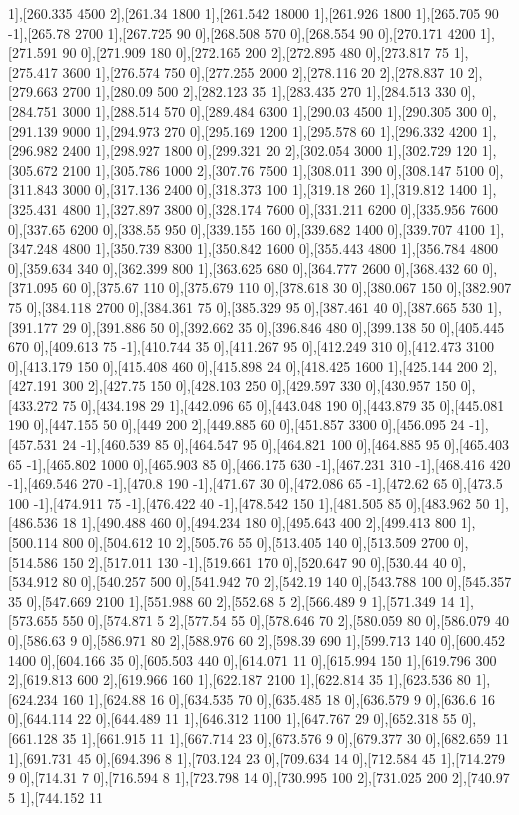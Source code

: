 {1],[260.335 4500 2],[261.34 1800 1],[261.542 18000 1],[261.926 1800 1],[265.705 90 -1],[265.78 2700 1],[267.725 90 0],[268.508 570 0],[268.554 90 0],[270.171 4200 1],[271.591 90 0],[271.909 180 0],[272.165 200 2],[272.895 480 0],[273.817 75 1],[275.417 3600 1],[276.574 750 0],[277.255 2000 2],[278.116 20 2],[278.837 10 2],[279.663 2700 1],[280.09 500 2],[282.123 35 1],[283.435 270 1],[284.513 330 0],[284.751 3000 1],[288.514 570 0],[289.484 6300 1],[290.03 4500 1],[290.305 300 0],[291.139 9000 1],[294.973 270 0],[295.169 1200 1],[295.578 60 1],[296.332 4200 1],[296.982 2400 1],[298.927 1800 0],[299.321 20 2],[302.054 3000 1],[302.729 120 1],[305.672 2100 1],[305.786 1000 2],[307.76 7500 1],[308.011 390 0],[308.147 5100 0],[311.843 3000 0],[317.136 2400 0],[318.373 100 1],[319.18 260 1],[319.812 1400 1],[325.431 4800 1],[327.897 3800 0],[328.174 7600 0],[331.211 6200 0],[335.956 7600 0],[337.65 6200 0],[338.55 950 0],[339.155 160 0],[339.682 1400 0],[339.707 4100 1],[347.248 4800 1],[350.739 8300 1],[350.842 1600 0],[355.443 4800 1],[356.784 4800 0],[359.634 340 0],[362.399 800 1],[363.625 680 0],[364.777 2600 0],[368.432 60 0],[371.095 60 0],[375.67 110 0],[375.679 110 0],[378.618 30 0],[380.067 150 0],[382.907 75 0],[384.118 2700 0],[384.361 75 0],[385.329 95 0],[387.461 40 0],[387.665 530 1],[391.177 29 0],[391.886 50 0],[392.662 35 0],[396.846 480 0],[399.138 50 0],[405.445 670 0],[409.613 75 -1],[410.744 35 0],[411.267 95 0],[412.249 310 0],[412.473 3100 0],[413.179 150 0],[415.408 460 0],[415.898 24 0],[418.425 1600 1],[425.144 200 2],[427.191 300 2],[427.75 150 0],[428.103 250 0],[429.597 330 0],[430.957 150 0],[433.272 75 0],[434.198 29 1],[442.096 65 0],[443.048 190 0],[443.879 35 0],[445.081 190 0],[447.155 50 0],[449 200 2],[449.885 60 0],[451.857 3300 0],[456.095 24 -1],[457.531 24 -1],[460.539 85 0],[464.547 95 0],[464.821 100 0],[464.885 95 0],[465.403 65 -1],[465.802 1000 0],[465.903 85 0],[466.175 630 -1],[467.231 310 -1],[468.416 420 -1],[469.546 270 -1],[470.8 190 -1],[471.67 30 0],[472.086 65 -1],[472.62 65 0],[473.5 100 -1],[474.911 75 -1],[476.422 40 -1],[478.542 150 1],[481.505 85 0],[483.962 50 1],[486.536 18 1],[490.488 460 0],[494.234 180 0],[495.643 400 2],[499.413 800 1],[500.114 800 0],[504.612 10 2],[505.76 55 0],[513.405 140 0],[513.509 2700 0],[514.586 150 2],[517.011 130 -1],[519.661 170 0],[520.647 90 0],[530.44 40 0],[534.912 80 0],[540.257 500 0],[541.942 70 2],[542.19 140 0],[543.788 100 0],[545.357 35 0],[547.669 2100 1],[551.988 60 2],[552.68 5 2],[566.489 9 1],[571.349 14 1],[573.655 550 0],[574.871 5 2],[577.54 55 0],[578.646 70 2],[580.059 80 0],[586.079 40 0],[586.63 9 0],[586.971 80 2],[588.976 60 2],[598.39 690 1],[599.713 140 0],[600.452 1400 0],[604.166 35 0],[605.503 440 0],[614.071 11 0],[615.994 150 1],[619.796 300 2],[619.813 600 2],[619.966 160 1],[622.187 2100 1],[622.814 35 1],[623.536 80 1],[624.234 160 1],[624.88 16 0],[634.535 70 0],[635.485 18 0],[636.579 9 0],[636.6 16 0],[644.114 22 0],[644.489 11 1],[646.312 1100 1],[647.767 29 0],[652.318 55 0],[661.128 35 1],[661.915 11 1],[667.714 23 0],[673.576 9 0],[679.377 30 0],[682.659 11 1],[691.731 45 0],[694.396 8 1],[703.124 23 0],[709.634 14 0],[712.584 45 1],[714.279 9 0],[714.31 7 0],[716.594 8 1],[723.798 14 0],[730.995 100 2],[731.025 200 2],[740.97 5 1],[744.152 11 }
